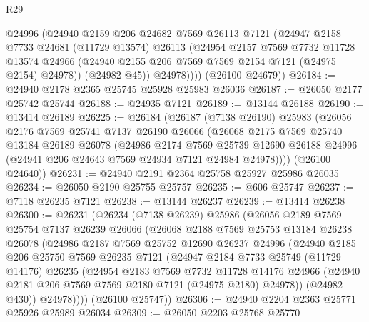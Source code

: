 \begin{lexlean}{R29}
\begin{coremodule}
            @24996
            (@24940
              @2159
              @206
              @24682
              @7569
              @26113
              @7121
              (@24947
                @2158
                @7733
                @24681
                (@11729 @13574)
                @26113
                (@24954
                  @2157
                  @7569
                  @7732
                  @11728
                  @13574
                  @24966
                  (@24940 @2155 @206 @7569 @7569 @2154 @7121 (@24975 @2154) @24978))
                (@24982 @45))
              @24978))))
      (@26100 @24679))
@26184 := @24940 @2178 @2365 @25745 @25928 @25983 @26036
@26187 := @26050 @2177 @25742 @25744
@26188 := @24935 @7121
@26189 := @13144 @26188
@26190 := @13414 @26189
@26225 := @26184
    (@26187
      (@7138 @26190)
      @25983
      (@26056
        @2176
        @7569
        @25741
        @7137
        @26190
        @26066
        (@26068
          @2175
          @7569
          @25740
          @13184
          @26189
          @26078
          (@24986
            @2174
            @7569
            @25739
            @12690
            @26188
            @24996
            (@24941 @206 @24643 @7569 @24934 @7121 @24984 @24978))))
      (@26100 @24640))
@26231 := @24940 @2191 @2364 @25758 @25927 @25986 @26035
@26234 := @26050 @2190 @25755 @25757
@26235 := @606 @25747
@26237 := @7118 @26235 @7121
@26238 := @13144 @26237
@26239 := @13414 @26238
@26300 := @26231
    (@26234
      (@7138 @26239)
      @25986
      (@26056
        @2189
        @7569
        @25754
        @7137
        @26239
        @26066
        (@26068
          @2188
          @7569
          @25753
          @13184
          @26238
          @26078
          (@24986
            @2187
            @7569
            @25752
            @12690
            @26237
            @24996
            (@24940
              @2185
              @206
              @25750
              @7569
              @26235
              @7121
              (@24947
                @2184
                @7733
                @25749
                (@11729 @14176)
                @26235
                (@24954
                  @2183
                  @7569
                  @7732
                  @11728
                  @14176
                  @24966
                  (@24940 @2181 @206 @7569 @7569 @2180 @7121 (@24975 @2180) @24978))
                (@24982 @430))
              @24978))))
      (@26100 @25747))
@26306 := @24940 @2204 @2363 @25771 @25926 @25989 @26034
@26309 := @26050 @2203 @25768 @25770

\end{coremodule}
\end{lexlean}
